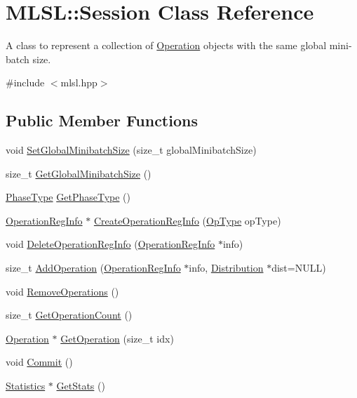 \hypertarget{classMLSL_1_1Session}{\section{M\-L\-S\-L\-:\-:Session Class Reference}
\label{classMLSL_1_1Session}
}


A class to represent a collection of \hyperlink{classMLSL_1_1Operation}{Operation} objects with the same global mini-\/batch size.  




{\ttfamily \#include $<$mlsl.\-hpp$>$}

\subsection*{Public Member Functions}
\begin{DoxyCompactItemize}
\item 
void \hyperlink{classMLSL_1_1Session_afa9f32e81f919bdb2ad7552ba7b6336d}{Set\-Global\-Minibatch\-Size} (size\-\_\-t global\-Minibatch\-Size)
\item 
size\-\_\-t \hyperlink{classMLSL_1_1Session_afc5b66026bb9df019723ea8d829e6eb5}{Get\-Global\-Minibatch\-Size} ()
\item 
\hyperlink{namespaceMLSL_a7d1938ee24117d29200c2d29562db712}{Phase\-Type} \hyperlink{classMLSL_1_1Session_a89e3d6e9677d9e916fba45c421755478}{Get\-Phase\-Type} ()
\item 
\hyperlink{classMLSL_1_1OperationRegInfo}{Operation\-Reg\-Info} $\ast$ \hyperlink{classMLSL_1_1Session_a882c57575b67320b17e3e357bcde2c31}{Create\-Operation\-Reg\-Info} (\hyperlink{namespaceMLSL_a1366e5621278eafc7ecb03de012824bf}{Op\-Type} op\-Type)
\item 
void \hyperlink{classMLSL_1_1Session_af3aef5f1a74cddad39747743787ef1c5}{Delete\-Operation\-Reg\-Info} (\hyperlink{classMLSL_1_1OperationRegInfo}{Operation\-Reg\-Info} $\ast$info)
\item 
size\-\_\-t \hyperlink{classMLSL_1_1Session_a165a77b678517fd7991777974681916c}{Add\-Operation} (\hyperlink{classMLSL_1_1OperationRegInfo}{Operation\-Reg\-Info} $\ast$info, \hyperlink{classMLSL_1_1Distribution}{Distribution} $\ast$dist=N\-U\-L\-L)
\item 
void \hyperlink{classMLSL_1_1Session_a6bdd4c1df2ce8b00e55b38278b330847}{Remove\-Operations} ()
\item 
size\-\_\-t \hyperlink{classMLSL_1_1Session_ac29bfe7dfda91a83e24a1181ca3fd070}{Get\-Operation\-Count} ()
\item 
\hyperlink{classMLSL_1_1Operation}{Operation} $\ast$ \hyperlink{classMLSL_1_1Session_ad24bd55c98a82b7ede9df63e1f36f7e2}{Get\-Operation} (size\-\_\-t idx)
\item 
void \hyperlink{classMLSL_1_1Session_a246d3dd4a2c5e5c5f49a5634641479f9}{Commit} ()
\item 
\hyperlink{classMLSL_1_1Statistics}{Statistics} $\ast$ \hyperlink{classMLSL_1_1Session_abd65aefd366220d1fc86f1780a8185c7}{Get\-Stats} ()
\end{DoxyCompactItemize}


